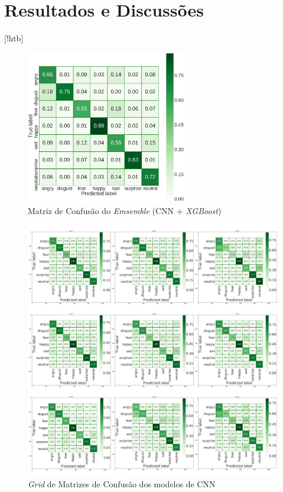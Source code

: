 \section{Resultados e Discussões}

[!htb]

\begin{figure}[!htb]
    \centering
    \includegraphics[width=7cm]{images/cm_emsemble.png}
    \caption{Matriz de Confusão do \emph{Emsemble} (CNN + \emph{XGBoost})}
    \label{fig:emsemble}
\end{figure}

\begin{figure}[!htb]
    \centering
    \includegraphics[width=15cm]{images/cm_grid.png}
    \caption{\emph{Grid} de Matrizes de Confusão dos modelos de CNN}
    \label{fig:grid}
\end{figure}